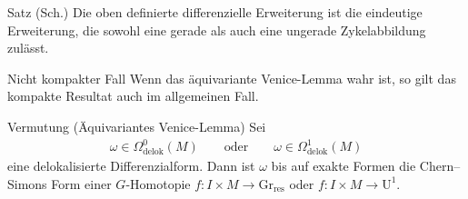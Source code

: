 \documentclass[12pt,utf8,notheorems,compress,t]{beamer}
\renewcommand{\_}{\mathpunct{.}}
\newcommand{\?}{\,{:}\,}
\begin{document}
\begin{frame}
    \begin{block}{Satz (Sch.)}
        Die oben definierte differenzielle Erweiterung ist die eindeutige
        Erweiterung, die sowohl eine gerade als auch eine ungerade
        Zykelabbildung zulässt. 
    \end{block}
\end{frame}
\begin{frame}{Nicht kompakter Fall}
    Wenn das äquivariante Venice-Lemma wahr ist, so gilt das kompakte Resultat
    auch im allgemeinen Fall.
    \begin{block}{Vermutung (Äquivariantes Venice-Lemma)}
        Sei
        \begin{align*}
            \omega\in \Omega^0_{\mathrm{delok}}(M) \qquad \mathrm{oder} \qquad
            \omega\in \Omega^1_{\mathrm{delok}}(M)
        \end{align*}
        eine delokalisierte Differenzialform. Dann ist $\omega$ bis auf exakte
        Formen die Chern--Simons Form einer $G$-Homotopie $f\colon I\times M \to
        \mathrm{Gr}_{\mathrm{res}}$ oder $f\colon I\times M \to
        \mathrm U^1$.
    \end{block}
\end{frame}
\end{document}
